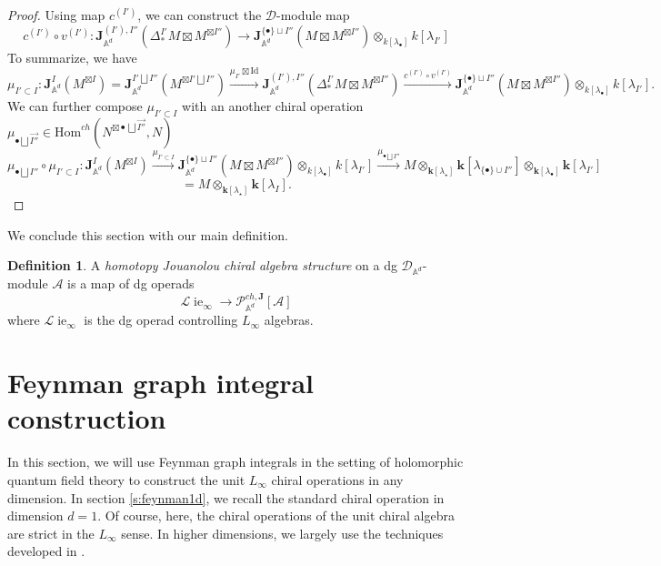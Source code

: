 \documentclass[11pt]{amsart}
\theoremstyle{definition}
\newtheorem{defn}[thm]{Definition}
\theoremstyle{remark}
\numberwithin{equation}{section}
\newcommand{\op}{\operatorname}
\begin{document}
\begin{proof}
Using map $c^{(I')}$, we can construct the $\mathcal{D}$-module map 
$$
c^{(I')}\circ v^{(I')}:\mathbf{J}^{({I'}),{{I''}}}_{\mathbb{A}^d}(\Delta^{I'}_*M\boxtimes M^{\boxtimes{I''}})\rightarrow \mathbf{J}^{\{\bullet\}\sqcup{{I''}}}_{\mathbb{A}^d}(M\boxtimes M^{\boxtimes{I''}})\otimes_{k[\lambda_{\bullet}]}k[\lambda_{I'}]
$$
To summarize, we have
$$
\mu_{{I'}\subset {I}}:\mathbf{J}^{{I}}_{\mathbb{A}^d}(M^{\boxtimes{I}})=\mathbf{J}^{{I'}\bigsqcup {I''}}_{\mathbb{A}^d}(M^{\boxtimes{I'}\bigsqcup {I''}})\xrightarrow{\mu_{{I'}}\boxtimes \mathrm{Id}} \mathbf{J}^{({I'}),{{I''}}}_{\mathbb{A}^d}(\Delta^{I'}_*M\boxtimes M^{\boxtimes{I''}})\xrightarrow{c^{(I')}\circ v^{(I')}} \mathbf{J}^{\{\bullet\}\sqcup{{I''}}}_{\mathbb{A}^d}(M\boxtimes M^{\boxtimes{I''}})\otimes_{k[\lambda_{\bullet}]}k[\lambda_{I'}].
$$
We can further compose $\mu_{ I'\subset  I}$ with an another chiral operation $\mu_{\bullet \bigsqcup \vec{I''}}\in \mathrm{Hom}^{ch}(N^{\boxtimes \bullet \bigsqcup \vec{I''}},N)$
\[
\mu_{\bullet \bigsqcup {I''}}\circ\mu_{{I'}\subset {I}}:\mathbf{J}^{{I}}_{\mathbb{A}^d}(M^{\boxtimes{I}})\xrightarrow{\mu_{{I'}\subset {I}}}  \mathbf{J}^{\{\bullet\}\sqcup{{I''}}}_{\mathbb{A}^d}(M\boxtimes M^{\boxtimes{I''}})\otimes_{k[\lambda_{\bullet}]}k[\lambda_{I'}]\xrightarrow{\mu_{\bullet \bigsqcup {I''}}}M\otimes_{\mathbf{k}[\lambda_{\star}]}\mathbf{k}[\lambda_{\{\bullet\}\cup I''}]\otimes_{\mathbf{k}[\lambda_{\bullet}]}\mathbf{k}[\lambda_{I'}]
\]
\[
=M\otimes_{\mathbf{k}[\lambda_{\star}]}\mathbf{k}[\lambda_{I}].
\]

\end{proof}

We conclude this section with our main definition. 

\begin{defn}
  A \textit{homotopy Jouanolou chiral algebra structure} on a dg $\mathcal{D}_{\mathbb{A}^d}$-module $\mathcal{A}$ is a map of dg operads
  \[
\mathcal{L}\!\op{ie}_{\infty}\rightarrow \mathcal{P}^{ch,\mathbf{J}}_{\mathbb{A}^d}[\mathcal{A}]
\]
where $\mathcal{L}\!\op{ie}_{\infty}$ is the dg operad controlling $L_\infty$ algebras.
\end{defn}


\section{Feynman graph integral construction}\label{s:feynman}

In this section, we will use Feynman graph integrals in the setting of holomorphic quantum field theory to construct the unit
$L_{\infty}$ chiral operations in any dimension.
In section \ref{s:feynman1d}, we recall the standard chiral operation in dimension $d=1$.
Of course, here, the chiral operations of the unit chiral algebra are strict in the $L_\infty$ sense.
In higher dimensions, we largely use the techniques developed in \cite{wang2024feynman}.
\end{document}
